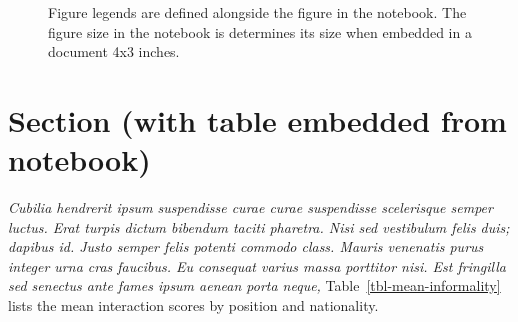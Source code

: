 \documentclass[
  a4paper,
]{scrbook}
\begin{document}
\begin{figure}[H]


\caption{\label{fig-meaninformality}Figure legends are defined alongside
the figure in the notebook. The figure size in the notebook is
determines its size when embedded in a document 4x3 inches.}

\end{figure}%

\section{Section (with table embedded from
notebook)}\label{section-with-table-embedded-from-notebook}

\emph{Cubilia hendrerit ipsum suspendisse curae curae suspendisse
scelerisque semper luctus. Erat turpis dictum bibendum taciti pharetra.
Nisi sed vestibulum felis duis; dapibus id. Justo semper felis potenti
commodo class. Mauris venenatis purus integer urna cras faucibus. Eu
consequat varius massa porttitor nisi. Est fringilla sed senectus ante
fames ipsum aenean porta neque,} Table~\ref{tbl-mean-informality} lists
the mean interaction scores by position and nationality.
\end{document}

